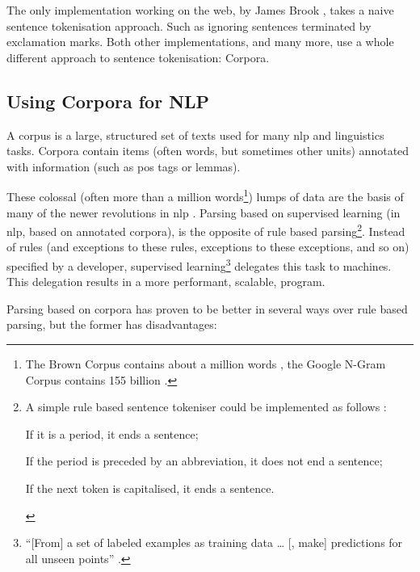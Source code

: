 The only implementation working on the web, by James Brook
  \autocite*{jbrooksuk/node-summary-source-code}, takes a naive sentence
  tokenisation approach.
Such as ignoring sentences terminated by exclamation marks.
Both other implementations, and many more, use a whole different approach to
  sentence tokenisation: Corpora.

\subsection{Using Corpora for NLP}\label{using-corpora-for}

A corpus is a large, structured set of texts used for many \gls{nlp}
  and linguistics tasks.
Corpora contain items (often words, but sometimes other units) annotated
  with information (such as \gls{pos} tags or lemmas).

These colossal (often more than a million words\footnote{The Brown Corpus
    contains about a million words \autocite{francis-nelson-brown-corpus},
    the Google N-Gram Corpus contains 155 billion
    \autocite{brants-thorsten-google-ngram-corpus}.})
  lumps of data are the basis of many of the newer revolutions in \gls{nlp}
  \autocite{mitkov-ruslan-ea-importance-corpora}.
Parsing based on supervised learning (in \gls{nlp}, based on annotated
  corpora), is the opposite of rule based parsing\footnote{A simple
    rule based sentence tokeniser could be implemented as follows
    \autocite{attivio.com-doing-things-with-sentences}:

    \begin{aenumerate}
      \item If it is a period, it ends a sentence;
      \item If the period is preceded by an abbreviation, it does not end
        a sentence;
      \item If the next token is capitalised, it ends a sentence.
    \end{aenumerate}}.
Instead of rules (and exceptions to these rules, exceptions to these
  exceptions, and so on) specified by a developer,
  supervised learning\footnote{``{[}From{]} a set of labeled examples as
    training data \ldots{} {[}, make{]} predictions for all unseen points''
    \autocite{mohri-mehryar-foundations-machine-learning}.}
  delegates this task to machines.
This delegation results in a more performant, scalable, program.

Parsing based on corpora has proven to be better in several ways over
  rule based parsing, but the former has disadvantages:


